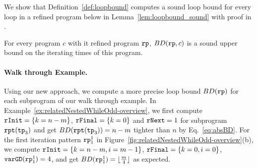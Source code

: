 \begin{defn}
\end{defn}
  We show that Definition~\ref{def:loopbound} computes a sound loop bound for every loop in a refined program below in Lemma~\ref{lem:loopbound_sound} with proof in .
\begin{lem}
  \label{lem:loopbound_sound}
  For every program $c$ with it refined program $\mathtt{rp}$,
  $BD(\mathtt{rp}, c)$ is a sound upper bound on the iterating times of this program.
\end{lem}

\paragraph{Walk through Example.}
Using our new approach, we compute a more precise loop bound $BD(\mathtt{rp})$ for each subprogram of our walk through example. In Example~\ref{ex:relatedNestedWhileOdd-overview}, we first compute $\mathtt{rInit} = \{k = n - m\}$, $\mathtt{rFinal} = \{k = 0\}$ and $\mathtt{rNext} = 1$ for subprogram $\mathtt{rpt}(\mathtt{tp}_3)$ and get $BD(\mathtt{rpt}(\mathtt{tp}_3)) = n - m$ tighter than $n$ by Eq.~\ref{eq:absBD}.
For the first iteration pattern $\mathtt{rp}_1^1$ in Figure~\ref{fig:relatedNestedWhileOdd-overview}(b), we compute 
$\mathtt{rInit} = \{k = n - m, i = m - 1\}$, $\mathtt{rFinal} = \{k = 0, i = 0\}$, $\mathtt{varGD}(\mathtt{rp}_1^1) = 4$, and get $BD(\mathtt{rp}_1^1) = \lfloor \frac{m}{4} \rfloor $ as expected.



